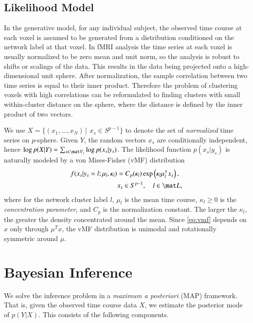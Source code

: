 \documentclass[final,authoryear,5p,twocolumn]{elsarticle}
\begin{document}
\subsection{Likelihood Model}
In the generative model, for any individual subject, the observed time course at
each voxel is assumed to be generated from a distribution conditioned on the
network label at that voxel. In fMRI analysis the time series at each voxel is
usually normalized to be zero mean and unit norm, so the analysis is robust to
shifts or scalings of the data. This results in the data being projected onto a
high-dimensional unit sphere. After normalization, the sample correlation
between two time series is equal to their inner product. Therefore the problem
of clustering voxels with high correlations can be reformulated to finding
clusters with small within-cluster distance on the sphere, where the distance is
defined by the inner product of two vectors.


We use $ X = \{ (x_1, \dots, x_N)\, |\, \ x_s \in S^{p-1} \}$ to denote the set
of \emph{normalized} time series on $p$-sphere. Given $Y$, the random vectors $
x_s$ are conditionally independent, hence $\log p( X | Y) = \sum_{s \in \mat V_j} \log
p (x_s | y_s)$.  The likelihood function $p( x_s | y_s)$ is naturally modeled by
a von Mises-Fisher (vMF) distribution
\begin{align}
 f ( x_s| y_s = l; \mu_l, \kappa_l) &= C_p(\kappa_l) \exp \left(\kappa_l  \mu_l^{\intercal} x_s\right), \label{eq:vmf}\\
  & x_s \in S^{p-1},  \quad  l \in {\mat L},  \nonumber
\end{align}
where for the network cluster label $l$, $\mu_l$ is the mean time course,
$\kappa_l \geq 0$ is the \emph{concentration parameter}, and $C_p$ is the
normalization constant. The larger the $\kappa_l$, the greater the density
concentrated around the mean. Since \eqref{eq:vmf} depends on $x$ only through
$\mu^T x$, the vMF distribution is unimodal and rotationally symmetric around
$\mu$.

\section{Bayesian Inference}
\label{sec:inference}
We solve the inference problem in a \emph{maximum a posteriori} (MAP)
framework. That is, given the observed time course data $X$, we estimate the
posterior mode of $p(Y|X)$. This consists of the following components.
\end{document}
